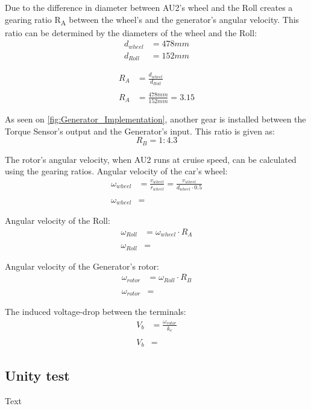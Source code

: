 Due to the difference in diameter between AU2's wheel and the Roll creates a gearing ratio R\textsubscript{A} between the wheel's and the generator's angular velocity. This ratio can be determined by the diameters of the wheel and the Roll:
\begin{equation}
	\begin{split}
		d_{wheel} &= 478 mm\\
		d_{Roll} &= 152 mm
	\end{split}
\end{equation}

\begin{equation}
	\begin{split}
		R_A &= \frac{d_{wheel}}{d_{Roll}}\\
		\\
		R_A &= \frac{478 mm}{152 mm} = 3.15
	\end{split}
\end{equation}

As seen on \vref{fig:Generator_Implementation}, another gear is installed between the Torque Sensor's output and the Generator's input. This ratio is given as:
\begin{equation}
	R_B = 1:4.3
\end{equation}

The rotor's angular velocity, when AU2 runs at cruise speed, can be calculated using the gearing ratios. Angular velocity of the car's wheel:
\begin{equation}
	\begin{split}
		\omega_{wheel} &= \frac{v_{wheel}}{r_{wheel}} = \frac{v_{wheel}}{d_{wheel} \cdot 0.5}\\
		\\
		\omega_{wheel} &=
	\end{split}
\end{equation}

Angular velocity of the Roll:
\begin{equation}
	\begin{split}
		\omega_{Roll} &= \omega_{wheel} \cdot R_A\\
		\\
		\omega_{Roll} &=
	\end{split}
\end{equation}

Angular velocity of the Generator's rotor:
\begin{equation}
	\begin{split}
		\omega_{rotor} &= \omega_{Roll} \cdot R_B\\
		\\
		\omega_{rotor} &=
	\end{split}
\end{equation}

The induced voltage-drop between the terminals:
\begin{equation}
	\begin{split}
		V_b &= \frac{\omega_{rotor}}{k_e}\\
		\\
		V_b &=
	\end{split}
\end{equation}

\subsection{Unity test}
Text
